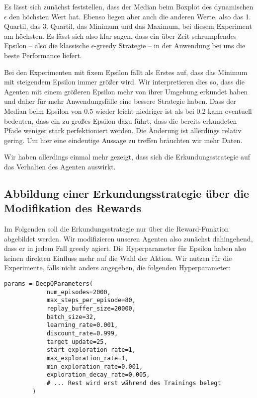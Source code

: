 Es lässt sich zunächst feststellen, dass der Median beim Boxplot des dynamischen $ \epsilon $ den höchsten Wert hat. Ebenso liegen aber auch die anderen Werte, also das 1. Quartil, das 3. Quartil, das Minimum und das Maximum, bei diesem Experiment am höchsten. Es lässt sich also klar sagen, dass ein über Zeit schrumpfendes Epsilon -- also die klassische $ \epsilon $-greedy Strategie -- in der Anwendung bei uns die beste Performance liefert.

Bei den Experimenten mit fixem Epsilon fällt als Erstes auf, dass das Minimum mit steigendem Epsilon immer größer wird. Wir interpretieren dies so, dass die Agenten mit einem größeren Epsilon mehr von ihrer Umgebung erkundet haben und daher für mehr Anwendungsfälle eine bessere Strategie haben. Dass der Median beim Epsilon von 0.5 wieder leicht niedriger ist als bei 0.2 kann eventuell bedeuten, dass ein zu großes Epsilon dazu führt, dass die bereits erkundeten Pfade weniger stark perfektioniert werden. Die Änderung ist allerdings relativ gering. Um hier eine eindeutige Aussage zu treffen bräuchten wir mehr Daten.

Wir haben allerdings einmal mehr gezeigt, dass sich die Erkundungsstrategie auf das Verhalten des Agenten auswirkt.

\subsection{Abbildung einer Erkundungsstrategie über die Modifikation des Rewards} \label{sec:deepQRewardModification}
Im Folgenden soll die Erkundungsstrategie nur über die Reward-Funktion abgebildet werden. Wir modifizieren unseren Agenten also zunächst dahingehend, dass er in jedem Fall greedy agiert. Die Hyperparameter für Epsilon haben also keinen direkten Einfluss mehr auf die Wahl der Aktion. Wir nutzen für die Experimente, falls nicht anders angegeben, die folgenden Hyperparameter:
\begin{samepage}
\begin{verbatim}
params = DeepQParameters(
            num_episodes=2000,
            max_steps_per_episode=80,
            replay_buffer_size=20000,
            batch_size=32,
            learning_rate=0.001,
            discount_rate=0.999,
            target_update=25,
            start_exploration_rate=1,
            max_exploration_rate=1,
            min_exploration_rate=0.001,
            exploration_decay_rate=0.005,
            # ... Rest wird erst während des Trainings belegt
        )
\end{verbatim}
\end{samepage}

